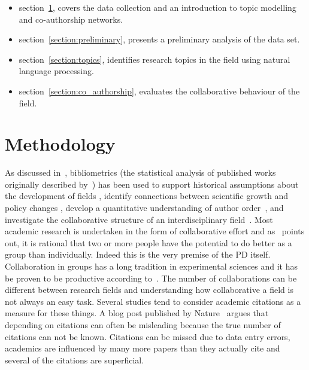 \begin{itemize}
    \item section~\ref{section:methodology}, covers the data collection and an introduction
    to topic modelling and co-authorship networks.
    \item section~\ref{section:preliminary}, presents a preliminary analysis of the
    data set.
    \item section~\ref{section:topics}, identifies research topics in the field using
    natural language processing.
    \item section~\ref{section:co_authorship}, evaluates the collaborative behaviour
    of the field.
\end{itemize}

\section{Methodology}\label{section:methodology}

As discussed in~\cite{youngblood2018}, bibliometrics (the statistical analysis
of published works originally described by~\cite{pritchard1969}) has been used
to support historical assumptions about the development of fields
\cite{raina1998}, identify connections between scientific growth and policy
changes \cite{das2016}, develop a quantitative understanding of author
order~\cite{sekara2018}, and investigate the collaborative structure of an
interdisciplinary field~\cite{Liu2015}. Most academic research is undertaken in
the form of collaborative effort and as~\cite{Kyvik2017} points out, it is
rational that two or more people have the potential to do better as a group
than individually. Indeed this is the very premise of the PD itself.
Collaboration in groups has a long tradition in experimental
sciences and it has be proven to be productive according
to~\cite{Etzkowitz1992}. The number of collaborations can be different
between research fields and understanding how collaborative a field is not
always an easy task. Several studies tend to consider academic citations as a
measure for these things. A blog post published by Nature~\cite{nature_blog}
argues that depending on citations can often be misleading because the true
number of citations can not be known. Citations can be missed due to data entry
errors, academics are influenced by many more papers than they actually cite and
several of the citations are superficial.


